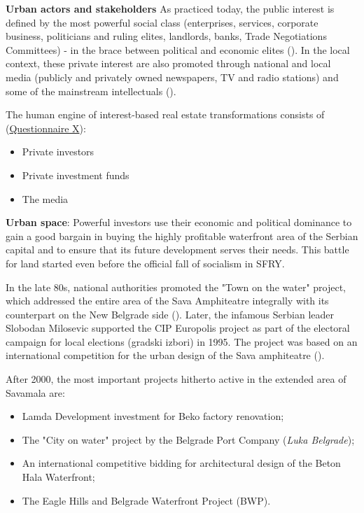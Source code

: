 \documentclass[11pt]{report}
\begin{document}
\begin{itemize}
\textbf{Urban actors and stakeholders}
As practiced today, the public interest is defined by the most powerful social class (enterprises, services, corporate business, politicians and ruling elites, landlords, banks, Trade Negotiations Committees) - in the brace between political and economic elites (\href{ref}{\citealt{ministarstvo_prostora_urbani_2014}}).
In the local context, these private interest are also promoted through national and local media (publicly and privately owned newspapers, TV and radio stations) and some of the mainstream intellectuals (\href{Nikolic}{\citealt{nikolic_medijska_2015}}).

The human engine of interest-based real estate transformations consists of (\href{Questionnaire Experts Post-socialist}{Questionnaire X}):

\begin{itemize}
\item Private investors
\item Private investment funds
\item The media
\end{itemize}

\textbf{Urban space}:
Powerful investors use their economic and political dominance to gain a good bargain in buying the highly profitable waterfront area of the Serbian capital and to ensure that its future development serves their needs. This battle for land started even before the official fall of socialism in SFRY.

In the late 80s, national authorities promoted the "Town on the water" project, which addressed the entire area of the Sava Amphiteatre integrally with its counterpart on the New Belgrade side (\href{Savski}{\citealt{urbanisticki_zavod_beograda_program_2008}}).
Later, the infamous Serbian leader Slobodan Milosevic supported the CIP Europolis project as part of the electoral campaign for local elections (gradski izbori) in 1995. The project was based on an international competition for the urban design of the Sava amphiteatre (\href{Savski}{\citealt{urbanisticki_zavod_beograda_program_2008}}).

After 2000, the most important projects hitherto active in the extended area of Savamala are:

\begin{itemize}
\item Lamda Development investment for Beko factory renovation;
\item The "City on water" project by the Belgrade Port Company (\textit{Luka Belgrade});
\item An international competitive bidding for architectural design of the Beton Hala Waterfront;
\item The Eagle Hills and Belgrade Waterfront Project (BWP).
\end{itemize}


\end{itemize}
\end{document}
